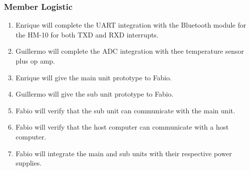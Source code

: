 \subsubsection{Member Logistic}
\begin{enumerate}
  \item Enrique will complete the UART integration with the Bluetooth module for the HM-10 for both TXD and RXD interrupts.
  \item Guillermo will complete the ADC integration with thee temperature sensor plus op amp.
  \item Enrique will give the main unit prototype to Fabio.
  \item Guillermo will give the sub unit prototype to Fabio.
  \item Fabio will verify that the sub unit can communicate with the main unit.
  \item Fabio will verify that the host computer can communicate with a host computer.
  \item Fabio will integrate the main and sub units with their respective power supplies.
\end{enumerate}
